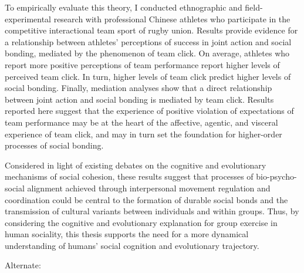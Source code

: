 To empirically evaluate this theory, I conducted ethnographic and field-experimental research with professional Chinese athletes who participate in the competitive interactional team sport of rugby union.  Results provide evidence for a relationship between athletes' perceptions of success in joint action and social bonding, mediated by the phenomenon of team click.  On average, athletes who report more positive perceptions of team performance report higher levels of perceived team click.  In turn, higher levels of team click predict higher levels of social bonding.  Finally, mediation analyses show that a direct relationship between joint action and social bonding is mediated by team click.  Results reported here suggest that the experience of positive violation of expectations of team performance may be at the heart of the affective, agentic, and visceral experience of team click, and may in turn set the foundation for higher-order processes of social bonding.

Considered in light of existing debates on the cognitive and evolutionary mechanisms of social cohesion, these results suggest that processes of bio-psycho-social alignment achieved through interpersonal movement regulation and coordination could be central to the formation of durable social bonds and the transmission of cultural variants between individuals and within groups.  Thus, by considering the cognitive and evolutionary explanation for group exercise in human sociality, this thesis supports the need for a more dynamical understanding of humans' social cognition and evolutionary trajectory.






Alternate:


